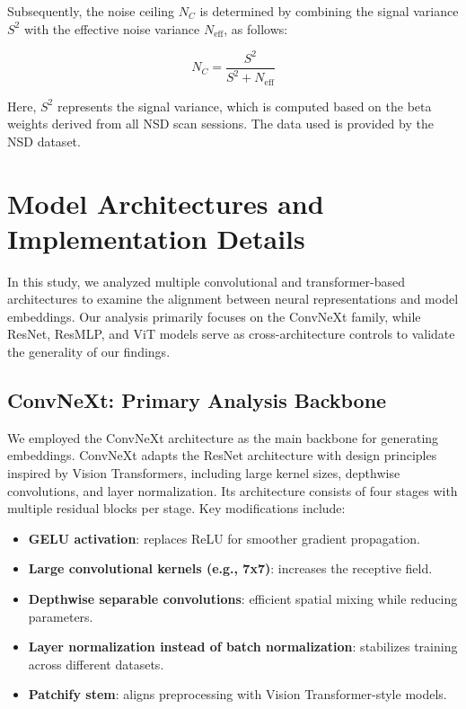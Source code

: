 \documentclass{article}
\theoremstyle{plain}
\theoremstyle{definition}
\theoremstyle{remark}
\begin{document}
Subsequently, the noise ceiling \( N_C \) is determined by combining the signal variance \( S^2 \) with the effective noise variance \( N_{\text{eff}} \), as follows:

\[
N_C = \frac{S^2}{S^2 + N_{\text{eff}}}
\]

Here, \( S^2 \) represents the signal variance, which is computed based on the beta weights derived from all NSD scan sessions. The data used is provided by the NSD dataset.









\section{Model Architectures and Implementation Details}
\label{supple:model_details}

In this study, we analyzed multiple convolutional and transformer-based architectures to examine the alignment between neural representations and model embeddings. Our analysis primarily focuses on the ConvNeXt family, while ResNet, ResMLP, and ViT models serve as cross-architecture controls to validate the generality of our findings. 


\subsection{ConvNeXt: Primary Analysis Backbone}
\label{supple:convnext}

We employed the ConvNeXt architecture \citep{liu2022convnet} as the main backbone for generating embeddings. ConvNeXt adapts the ResNet architecture with design principles inspired by Vision Transformers, including large kernel sizes, depthwise convolutions, and layer normalization. Its architecture consists of four stages with multiple residual blocks per stage. Key modifications include:


\begin{itemize}
    \item \textbf{GELU activation}: replaces ReLU for smoother gradient propagation.
    \item \textbf{Large convolutional kernels (e.g., 7x7)}: increases the receptive field.
    \item \textbf{Depthwise separable convolutions}: efficient spatial mixing while reducing parameters.
    \item \textbf{Layer normalization instead of batch normalization}: stabilizes training across different datasets.
    \item \textbf{Patchify stem}: aligns preprocessing with Vision Transformer-style models.
\end{itemize}
\end{document}
